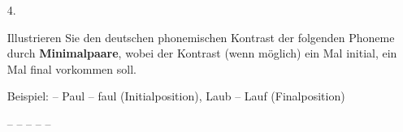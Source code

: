 {\begin{frame}
\begin{itemize}
\end{itemize}

\end{frame}

\begin{frame}

\begin{itemize}	
\item[4.]{Illustrieren Sie den deutschen phonemischen Kontrast der folgenden Phoneme durch \textbf{Minimalpaare}, wobei der Kontrast (wenn möglich) ein Mal initial, ein Mal final vorkommen soll.

Beispiel: \textipa{[p]} -- \textipa{[f]} Paul -- faul (Initialposition), Laub -- Lauf (Finalposition)}

\eal
\ex \textipa{[m]} -- \textipa{[n]}
\ex \textipa{[p]} -- \textipa{[b]}
\ex \textipa{[h]} -- \textipa{[v]}
\ex \textipa{[n]} -- \textipa{[N]}
\ex \textipa{[f]} -- \textipa{[v]}
\zl

\end{itemize}
\end{frame}
} 
